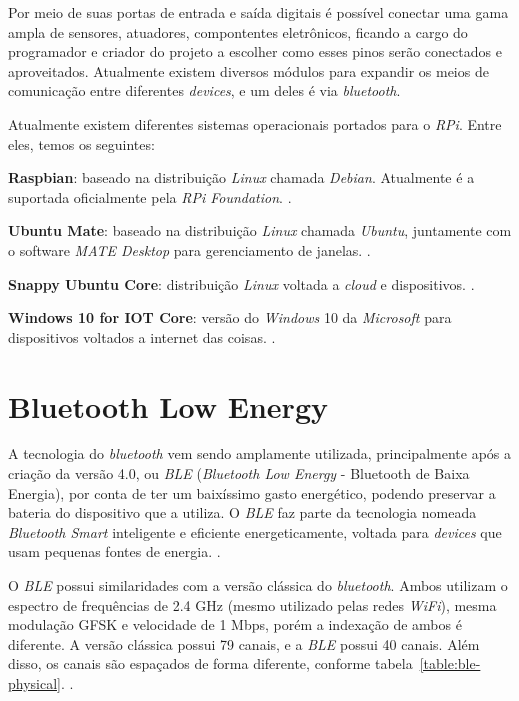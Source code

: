 \documentclass[
		12pt,				%
		openright,			%
		oneside,			%
		a4paper,			%
		chapter=TITLE,		%
		english,			%
		brazil				%
	]{abntex2}
\begin{document}
Por meio de suas portas de entrada e saída digitais é possível conectar uma gama ampla de sensores, atuadores, compontentes eletrônicos, ficando a cargo do programador e criador do projeto a escolher como esses pinos serão conectados e aproveitados. Atualmente existem diversos módulos para expandir os meios de comunicação entre diferentes \textit{devices}, e um deles é via \textit{bluetooth}.

Atualmente existem diferentes sistemas operacionais portados para o \textit{RPi}. Entre eles, temos os seguintes:

\begin{alineas}
	\item \textbf{Raspbian}: baseado na distribuição \textit{Linux} chamada \textit{Debian}. Atualmente é a suportada oficialmente pela \textit{RPi Foundation}. \cite{rpi-download}.
	\item \textbf{Ubuntu Mate}: baseado na distribuição \textit{Linux} chamada \textit{Ubuntu}, juntamente com o software \textit{MATE Desktop} para gerenciamento de janelas. \cite{ubuntu-mate}.
	\item \textbf{Snappy Ubuntu Core}: distribuição \textit{Linux} voltada a \textit{cloud} e dispositivos. \cite{snappy-ubuntu}.
	\item \textbf{Windows 10 for IOT Core}: versão do \textit{Windows} 10 da \textit{Microsoft} para dispositivos voltados a internet das coisas. \cite{windows10-iot}.
\end{alineas}

\section{Bluetooth Low Energy}

A tecnologia do \textit{bluetooth} vem sendo amplamente utilizada, principalmente após a criação da versão 4.0, ou \textit{BLE} (\textit{Bluetooth Low Energy} - Bluetooth de Baixa Energia), por conta de ter um baixíssimo gasto energético, podendo preservar a bateria do dispositivo que a utiliza. O \textit{BLE} faz parte da tecnologia nomeada \textit{Bluetooth Smart} inteligente e eficiente energeticamente, voltada para \textit{devices} que usam pequenas fontes de energia. \cite{bluetooth-smart}.

O \textit{BLE} possui similaridades com a versão clássica do \textit{bluetooth}. Ambos utilizam o espectro de frequências de 2.4 GHz (mesmo utilizado pelas redes \textit{WiFi}), mesma modulação GFSK e velocidade de 1 Mbps, porém a indexação de ambos é diferente. A versão clássica possui 79 canais, e a \textit{BLE} possui 40 canais. Além disso, os canais são espaçados de forma diferente, conforme tabela~\ref{table:ble-physical}. \cite{ble-packets}.
\end{document}
